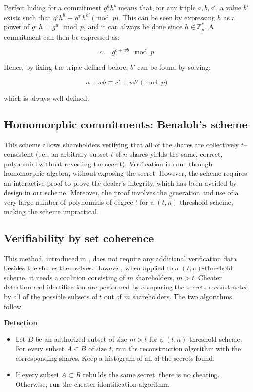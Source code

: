 \documentclass[10pt,journal,cspaper,compsoc]{IEEEtran}
\begin{document}
Perfect hiding for a commitment $g^a h^b$ means that, for any triple $a,b,a'$, a value $b'$ exists such that ${g^a h^b \equiv g^{a'} h^{b'} \pmod p}$. This can be seen by expressing $h$ as a power of $g$: ${h = g^w \mod p}$, and it can always be done since ${h \in \mathbb{Z}_p^*}$. A commitment can then be expressed as:

\begin{equation}
c = g^{a+wb} \mod p
\end{equation}

Hence, by fixing the triple defined before, $b'$ can be found by solving:

\begin{equation}
a+wb \equiv a' + wb' \pmod p
\end{equation}

which is always well-defined.

\subsection{Homomorphic commitments: Benaloh's scheme}
\label{benalohvss}
This scheme \cite{conf/crypto/Benaloh86a} allows shareholders verifying that all of the shares are collectively $t$--consistent (i.e., an arbitrary subset $t$ of $n$ shares yields the same, correct, polynomial without revealing the secret). Verification is done through homomorphic algebra, without exposing the secret. However, the scheme requires an interactive proof to prove the dealer's integrity, which has been avoided by design in our scheme. Moreover, the proof involves the generation and use of a very large number of polynomials of degree $t$ for a $(t, n)$ threshold scheme, making the scheme impractical.

\subsection{Verifiability by set coherence}
\label{setcoherence}
This method, introduced in \cite{journals/dcc/HarnL09}, does not require any additional verification data besides the shares themselves.
However, when applied to a $(t,n)$-threshold scheme, it needs a coalition consisting
of $m$ shareholders, $m>t$. Cheater detection and identification are performed by comparing the secrets reconstructed by all of the
possible subsets of $t$ out of $m$ shareholders. The two algorithms follow.


\textbf{Detection}

\begin{itemize}
\item{Let $B$ be an authorized subset of size $m>t$ for a $(t,n)$-threshold scheme. For every subset
$A \subset B$ of size $t$, run the reconstruction algorithm with the corresponding shares. Keep a
histogram of all of the secrets found};
\item{If every subset $A\subset B$ rebuilds the same secret, there is no cheating. Otherwise, run the cheater identification algorithm.}
\end{itemize}
\end{document}

